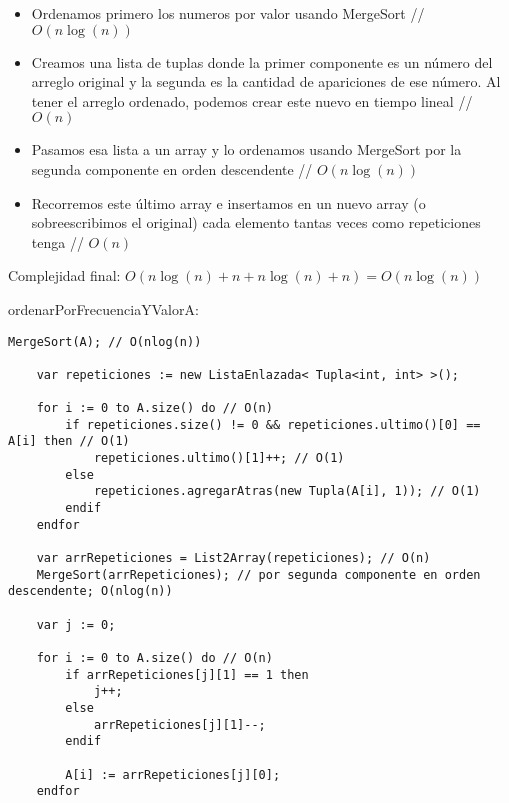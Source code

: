 \begin{itemize}
    \item Ordenamos primero los numeros por valor usando MergeSort // $O(n\log(n))$
    \item Creamos una lista de tuplas donde la primer componente es un número del arreglo original y la segunda es la cantidad de apariciones de ese número. Al tener el arreglo ordenado, podemos crear este nuevo en tiempo lineal // $O(n)$
    \item Pasamos esa lista a un array y lo ordenamos usando MergeSort por la segunda componente en orden descendente // $O(n\log(n))$
    \item Recorremos este último array e insertamos en un nuevo array (o sobreescribimos el original) cada elemento tantas veces como repeticiones tenga // $O(n)$
\end{itemize}

Complejidad final: $O(n\log(n) + n + n\log(n) + n) = O(n\log(n))$

\pagebreak
\begin{proc}{ordenarPorFrecuenciaYValor}{\Inout A: \Array{\Int}}{}
    \begin{lstlisting}[numbers=none,frame=none]
    MergeSort(A); // O(nlog(n))
    
    var repeticiones := new ListaEnlazada< Tupla<int, int> >();
    
    for i := 0 to A.size() do // O(n)
        if repeticiones.size() != 0 && repeticiones.ultimo()[0] == A[i] then // O(1)
            repeticiones.ultimo()[1]++; // O(1)
        else
            repeticiones.agregarAtras(new Tupla(A[i], 1)); // O(1)
        endif
    endfor
    
    var arrRepeticiones = List2Array(repeticiones); // O(n)
    MergeSort(arrRepeticiones); // por segunda componente en orden descendente; O(nlog(n))
    
    var j := 0;
    
    for i := 0 to A.size() do // O(n)
        if arrRepeticiones[j][1] == 1 then
            j++;
        else
            arrRepeticiones[j][1]--;
        endif
    
        A[i] := arrRepeticiones[j][0];
    endfor
    \end{lstlisting}
\end{proc}

